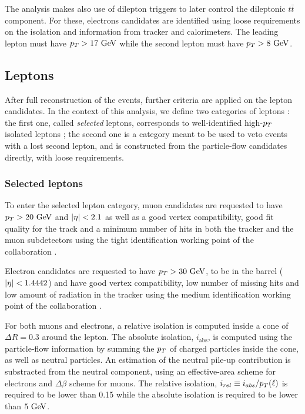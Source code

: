     The analysis makes also use of dilepton triggers to later control the dileptonic
    $t\bar{t}$ component. For these, electrons candidates are identified using loose
    requirements on the isolation and information from tracker and calorimeters. The
    leading lepton must have $p_T > 17~\text{GeV}$ while the second lepton must have $p_T > 8~\text{GeV}$.

        \subsection{Leptons}

    After full reconstruction of the events, further criteria are applied on the lepton
    candidates. In the context of this analysis, we define two categories of leptons :
    the first one, called \emph{selected} leptons, corresponds to well-identified high-$p_T$
    isolated leptons ; the second one is a category meant to be used to veto events with
    a lost second lepton, and is constructed from the particle-flow candidates directly,
    with loose requirements.

            \subsubsection{Selected leptons}

        To enter the selected lepton category, muon candidates are requested to have
    $p_T > 20~\text{GeV}$ and $\left| \eta \right| < 2.1$ as well as a good vertex compatibility, good fit
    quality for the track and a minimum number of hits in both the tracker and the muon
    subdetectors using the tight identification working point of the collaboration
    \cite{MuonID}.

        Electron candidates are requested to have $p_T > 30~\text{GeV}$, to be in the barrel
    ($\left| \eta \right| < 1.4442$) and have good vertex compatibility, low number of missing hits
    and low amount of radiation in the tracker using the medium identification working
    point of the collaboration \cite{ElectronID}.

    For both muons and electrons, a relative isolation is computed inside a cone of
    $\Delta R = 0.3$ around the lepton. The absolute isolation, $i_\text{abs}$, is computed
    using the particle-flow information by summing the $p_T$ of charged particles inside
    the cone, as well as neutral particles. An estimation of the neutral pile-up
    contribution is substracted from the neutral component, using an effective-area scheme
    for electrons and $\Delta \beta$ scheme for muons. The relative isolation, $i_{rel}
    \equiv i_{abs} / p_T(\ell)$ is required
    to be lower than 0.15 while the absolute isolation is required to be lower than $5~\text{GeV}$.

